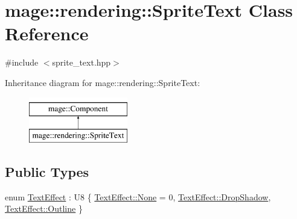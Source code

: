 \hypertarget{classmage_1_1rendering_1_1_sprite_text}{}\section{mage\+:\+:rendering\+:\+:Sprite\+Text Class Reference}
\label{classmage_1_1rendering_1_1_sprite_text}


{\ttfamily \#include $<$sprite\+\_\+text.\+hpp$>$}

Inheritance diagram for mage\+:\+:rendering\+:\+:Sprite\+Text\+:\begin{figure}[H]
\begin{center}
\leavevmode
\includegraphics[height=2.000000cm]{classmage_1_1rendering_1_1_sprite_text}
\end{center}
\end{figure}
\subsection*{Public Types}
\begin{DoxyCompactItemize}
\item 
enum \hyperlink{classmage_1_1rendering_1_1_sprite_text_af07ecf28d2ab8997c011cab74e799ef7}{Text\+Effect} \+: U8 \{ \hyperlink{classmage_1_1rendering_1_1_sprite_text_af07ecf28d2ab8997c011cab74e799ef7a6adf97f83acf6453d4a6a4b1070f3754}{Text\+Effect\+::\+None} = 0, 
\hyperlink{classmage_1_1rendering_1_1_sprite_text_af07ecf28d2ab8997c011cab74e799ef7a62fb0c043d7459d6590e00540884ea62}{Text\+Effect\+::\+Drop\+Shadow}, 
\hyperlink{classmage_1_1rendering_1_1_sprite_text_af07ecf28d2ab8997c011cab74e799ef7a606b51cc1c9d0b4af394419a22f2ff1f}{Text\+Effect\+::\+Outline}
 \}
\end{DoxyCompactItemize}
